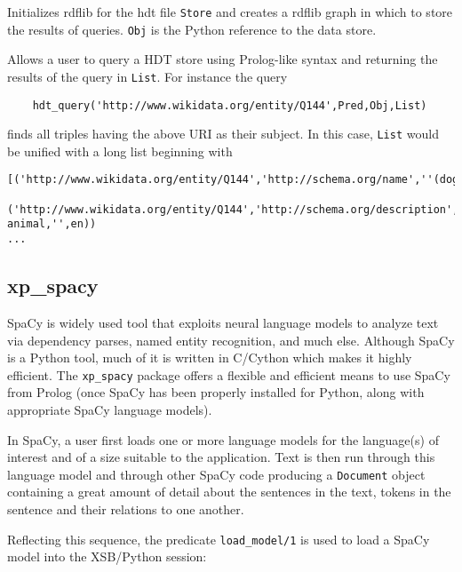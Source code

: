 \begin{description}
  Initializes rdflib for the hdt file {\tt Store} and creates a rdflib
  graph in which to store the results of queries.  {\tt Obj} is the
  Python reference to the data store.
  

  Allows a user to query a HDT store using Prolog-like syntax and
  returning the results of the query in {\tt List}.  For instance the query
\begin{verbatim}
    hdt_query('http://www.wikidata.org/entity/Q144',Pred,Obj,List)
\end{verbatim}
finds all triples having the above URI as their subject.  In this
case, {\tt List} would be unified with a long list beginning with
\begin{footnotesize}
\begin{verbatim}
[('http://www.wikidata.org/entity/Q144','http://schema.org/name',''(dog,'',en))
 ('http://www.wikidata.org/entity/Q144','http://schema.org/description',''('domestic animal,'',en))
...
\end{verbatim}
\end{footnotesize}
\end{description}

\subsection{xp\_spacy}
SpaCy is widely used tool that exploits neural language models to
analyze text via dependency parses, named entity recognition, and much
else.  Although SpaCy is a Python tool, much of it is written in
C/Cython which makes it highly efficient.  The {\tt xp\_spacy} package
offers a flexible and efficient means to use SpaCy from Prolog (once
SpaCy has been properly installed for Python, along with appropriate
SpaCy language models).

In SpaCy, a user first loads one or more language models for the
language(s) of interest and of a size suitable to the application.
Text is then run through this language model and through other SpaCy
code producing a {\tt Document} object containing a great amount of
detail about the sentences in the text, tokens in the sentence and
their relations to one another.

Reflecting this sequence, the predicate {\tt load\_model/1} is used to
load a SpaCy model into the XSB/Python session:


